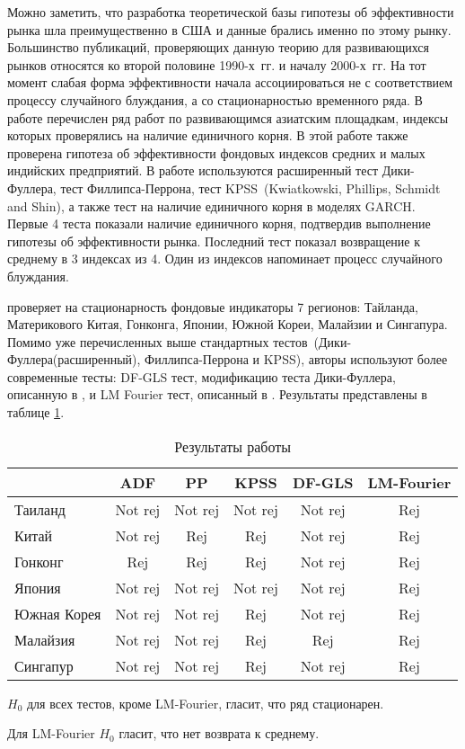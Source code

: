 \documentclass[a4paper,12pt]{article}
\begin{document}
Можно заметить, что разработка теоретической базы гипотезы об эффективности рынка шла преимущественно в США и данные брались именно по этому рынку. Большинство публикаций, проверяющих данную теорию для развивающихся рынков относятся ко второй половине 1990-х~гг. и началу 2000-х~гг. На тот момент слабая форма эффективности начала ассоциироваться не с соответствием процессу случайного блуждания, а со стационарностью временного ряда. В работе \cite{Mishra2017} перечислен ряд работ по развивающимся азиатским площадкам, индексы которых проверялись на наличие единичного корня. В этой работе также проверена гипотеза об эффективности фондовых индексов средних и малых индийских предприятий. В работе используются расширенный тест Дики-Фуллера, тест Филлипса-Перрона, тест KPSS~(Kwiatkowski, Phillips, Schmidt and Shin), а также тест на наличие единичного корня в моделях GARCH. Первые 4 теста показали наличие единичного корня, подтвердив выполнение гипотезы об эффективности рынка. Последний тест показал возвращение к среднему в 3 индексах из 4. Один из индексов напоминает процесс случайного блуждания.

\cite{Wang2015} проверяет на стационарность фондовые индикаторы 7 регионов: Тайланда, Материкового Китая, Гонконга, Японии, Южной Кореи, Малайзии и Сингапура. Помимо уже перечисленных выше стандартных тестов~(Дики-Фуллера(расширенный), Филлипса-Перрона и KPSS), авторы используют более современные тесты: DF-GLS тест, модификацию теста Дики-Фуллера, описанную в \cite{Elliot1996}, и LM Fourier тест, описанный в \cite{Enders2012}. Результаты представлены в таблице \ref{tab:wang}.

\begin{table}[]
\centering
\caption{Результаты работы \cite{Wang2015}}
\label{tab:wang}
\begin{tabular}{|l|c|c|c|c|c|}
\hline
 & ADF & PP & KPSS & DF-GLS & LM-Fourier \\ \hline
Таиланд & Not rej & Not rej & Not rej & Not rej & Rej \\ \hline
Китай & Not rej & Rej & Rej & Not rej & Rej \\ \hline
Гонконг & Rej & Rej & Rej & Not rej & Rej \\ \hline
Япония & Not rej & Not rej & Not rej & Not rej & Rej \\ \hline
Южная Корея & Not rej & Not rej & Rej & Not rej & Rej \\ \hline
Малайзия & Not rej & Not rej & Rej & Rej & Rej \\ \hline
Сингапур & Not rej & Not rej & Rej & Not rej & Rej \\ \hline
\end{tabular}

{\raggedright \par $H_0$ для всех тестов, кроме LM-Fourier, гласит, что ряд стационарен.}

{\raggedright \par Для LM-Fourier $H_0$ гласит, что нет возврата к среднему.}
\end{table}
\end{document}
